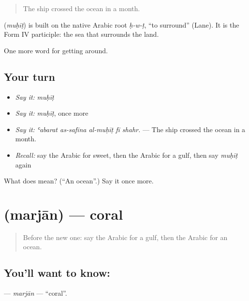 \begin{quote}
The ship crossed the ocean in a month.
\end{quote}

\begin{cousinweb}
\textbf{} (\emph{muḥīṭ}) is built on the native Arabic root \emph{ḥ-w-ṭ}, \textquotedblleft{}to surround\textquotedblright{} (Lane). It is the Form IV participle: the sea that surrounds the land.
\end{cousinweb}

\begin{grammarlens}[title={What you've built}]
One more word for getting around.
\end{grammarlens}

\subsection*{Your turn}
\begin{itemize}
\raggedright
  \item \emph{Say it:} \emph{muḥīṭ}
  \item \emph{Say it:} \emph{muḥīṭ}, once more
  \item \emph{Say it:} \emph{ʿabarat as-safīna al-muḥīṭ fī shahr.} — The ship crossed the ocean in a month.
  \item \emph{Recall:} say the Arabic for sweet, then the Arabic for a gulf, then say \emph{muḥīṭ} again
\end{itemize}

\begin{tcolorbox}[breakable,colback=teal!4,colframe=teal!35!black,title={Before you move on}]
What does  mean? (\textquotedblleft{}An ocean\textquotedblright{}.) Say it once more.
\end{tcolorbox}
\section[\texorpdfstring{\ar{مرجان} (marjān)}{مرجان (marjān)}]{ (marjān) — coral}

\label{lesson:AR-C471-marjan}



\begin{quote}
Before the new one: say the Arabic for a gulf, then the Arabic for an ocean.
\end{quote}

\subsection*{You'll want to know: }
\textbf{} — \emph{marjān} — \textquotedblleft{}coral\textquotedblright{}.

